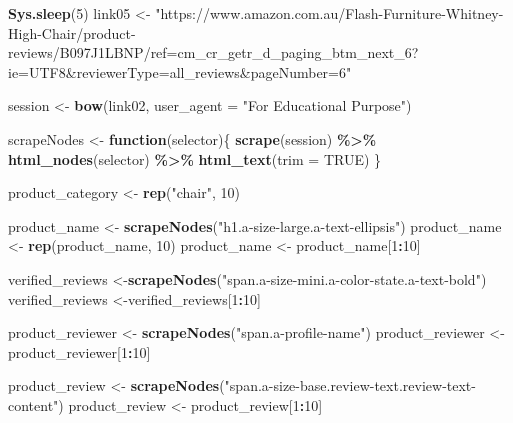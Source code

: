 \documentclass[
]{article}
\newenvironment{Shaded}{\begin{snugshade}}{\end{snugshade}}
\newcommand{\AttributeTok}[1]{\textcolor[rgb]{0.13,0.29,0.53}{#1}}
\newcommand{\ConstantTok}[1]{\textcolor[rgb]{0.56,0.35,0.01}{#1}}
\newcommand{\ControlFlowTok}[1]{\textcolor[rgb]{0.13,0.29,0.53}{\textbf{#1}}}
\newcommand{\DecValTok}[1]{\textcolor[rgb]{0.00,0.00,0.81}{#1}}
\newcommand{\FunctionTok}[1]{\textcolor[rgb]{0.13,0.29,0.53}{\textbf{#1}}}
\newcommand{\NormalTok}[1]{#1}
\newcommand{\OtherTok}[1]{\textcolor[rgb]{0.56,0.35,0.01}{#1}}
\newcommand{\SpecialCharTok}[1]{\textcolor[rgb]{0.81,0.36,0.00}{\textbf{#1}}}
\newcommand{\StringTok}[1]{\textcolor[rgb]{0.31,0.60,0.02}{#1}}
\begin{document}
\begin{Shaded}
\begin{Highlighting}[]
   \FunctionTok{Sys.sleep}\NormalTok{(}\DecValTok{5}\NormalTok{)}
\NormalTok{link05 }\OtherTok{\textless{}{-}} \StringTok{"https://www.amazon.com.au/Flash{-}Furniture{-}Whitney{-}High{-}Chair/product{-}reviews/B097J1LBNP/ref=cm\_cr\_getr\_d\_paging\_btm\_next\_6?ie=UTF8\&reviewerType=all\_reviews\&pageNumber=6"}


\NormalTok{  session }\OtherTok{\textless{}{-}} \FunctionTok{bow}\NormalTok{(link02,}
               \AttributeTok{user\_agent =} \StringTok{"For Educational Purpose"}\NormalTok{)}

\NormalTok{  scrapeNodes }\OtherTok{\textless{}{-}} \ControlFlowTok{function}\NormalTok{(selector)\{}
    \FunctionTok{scrape}\NormalTok{(session) }\SpecialCharTok{\%\textgreater{}\%}
      \FunctionTok{html\_nodes}\NormalTok{(selector) }\SpecialCharTok{\%\textgreater{}\%}
      \FunctionTok{html\_text}\NormalTok{(}\AttributeTok{trim =} \ConstantTok{TRUE}\NormalTok{)}
\NormalTok{  \}}

\NormalTok{  product\_category }\OtherTok{\textless{}{-}} \FunctionTok{rep}\NormalTok{(}\StringTok{"chair"}\NormalTok{, }\DecValTok{10}\NormalTok{)}

\NormalTok{  product\_name }\OtherTok{\textless{}{-}} \FunctionTok{scrapeNodes}\NormalTok{(}\StringTok{"h1.a{-}size{-}large.a{-}text{-}ellipsis"}\NormalTok{)}
\NormalTok{  product\_name }\OtherTok{\textless{}{-}} \FunctionTok{rep}\NormalTok{(product\_name, }\DecValTok{10}\NormalTok{)}
\NormalTok{  product\_name }\OtherTok{\textless{}{-}}\NormalTok{ product\_name[}\DecValTok{1}\SpecialCharTok{:}\DecValTok{10}\NormalTok{]}
  
\NormalTok{  verified\_reviews }\OtherTok{\textless{}{-}}\FunctionTok{scrapeNodes}\NormalTok{(}\StringTok{"span.a{-}size{-}mini.a{-}color{-}state.a{-}text{-}bold"}\NormalTok{)}
\NormalTok{  verified\_reviews }\OtherTok{\textless{}{-}}\NormalTok{verified\_reviews[}\DecValTok{1}\SpecialCharTok{:}\DecValTok{10}\NormalTok{]}
  
\NormalTok{  product\_reviewer }\OtherTok{\textless{}{-}} \FunctionTok{scrapeNodes}\NormalTok{(}\StringTok{"span.a{-}profile{-}name"}\NormalTok{)}
\NormalTok{  product\_reviewer }\OtherTok{\textless{}{-}}\NormalTok{ product\_reviewer[}\DecValTok{1}\SpecialCharTok{:}\DecValTok{10}\NormalTok{]}
  
\NormalTok{  product\_review }\OtherTok{\textless{}{-}} \FunctionTok{scrapeNodes}\NormalTok{(}\StringTok{"span.a{-}size{-}base.review{-}text.review{-}text{-}content"}\NormalTok{)}
\NormalTok{  product\_review }\OtherTok{\textless{}{-}}\NormalTok{ product\_review[}\DecValTok{1}\SpecialCharTok{:}\DecValTok{10}\NormalTok{]}
  

\end{Highlighting}
\end{Shaded}
\end{document}
